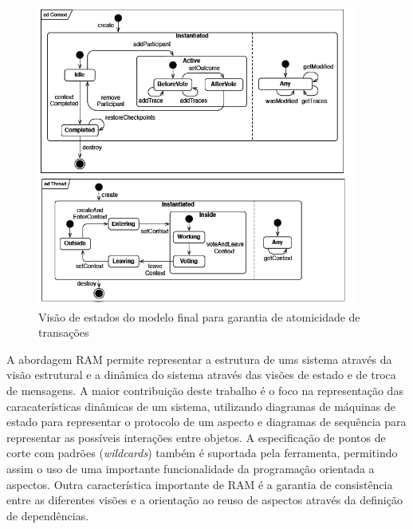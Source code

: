 \begin{landscape}
\begin{figure}
	\centering
	\includegraphics[width=400px]{img/p87_state_final_model.png}
	\caption{Visão de estados do modelo final para garantia de atomicidade de transações}\label{fig:p87_state_final_model}
\end{figure}
\end{landscape}

A abordagem RAM permite representar a estrutura de ums sistema através da visão estrutural e a dinâmica do sistema através das visões de estado
e de troca de mensagens. A maior contribuição deste trabalho é o foco na representação das caracaterísticas dinâmicas de um sistema, utilizando
diagramas de máquinas de estado para representar o protocolo de um aspecto e diagramas de sequência para representar as possíveis interações entre
objetos. A especificação de pontos de corte com padrões (\textit{wildcards}) também é suportada pela ferramenta, permitindo assim o uso de uma 
importante funcionalidade da programação orientada a aspectos. Outra característica importante de RAM é a garantia de consistência entre as
diferentes visões e a orientação ao reuso de aspectos através da definição de dependências. 

